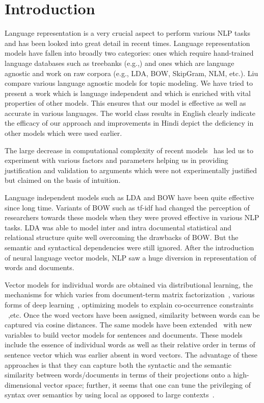 \chapter{Introduction}
Language representation is a very crucial aspect to perform various NLP tasks and has been looked into great detail in recent times. Language representation models have fallen into broadly two categories: ones which require hand-trained language databases such as treebanks (e.g.,\cite{Socher:13}) and ones which are language agnostic and work on raw corpora (e.g., LDA, BOW, SkipGram, NLM, etc.). Liu \cite{Liu:15} compare various language agnostic models for topic modeling. We have tried to present a work which is language independent and which is enriched with vital properties of other models. This ensures that our model is effective as well as accurate in various languages. The world class results in English clearly indicate the efficacy of our approach and improvements in Hindi depict the deficiency in other models which were used earlier.

The large decrease in computational complexity of recent models~\cite{Mikolov:13a,Mikolov:13b,Le:14} has led us to experiment with various factors and parameters helping us in providing justification and validation to arguments which were not experimentally justified but claimed on the basis of intuition.

Language independent models such as LDA  and BOW have been quite effective since long time. Variants of BOW such as tf-idf had changed the perception of researchers towards these models when they were proved effective in various NLP tasks. LDA was able to model inter and intra documental statistical and relational structure quite well overcoming the drawbacks of BOW. But the semantic and syntactical dependencies were still ignored. After the introduction of neural language vector models,  NLP saw a huge diversion in representation of words and documents.

Vector models for individual words are obtained via distributional learning, the mechanisms for which varies from document-term matrix factorization~\cite{Landauer:97}, various forms of deep learning~\cite{Collobert:08,Turian:10,Socher:13}, optimizing models to explain co-occurrence constraints ~\cite{Mikolov:13a,Pennington:14},etc. Once the word vectors have been assigned, similarity between words can be captured via cosine distances. The same models have been extended~\cite{Le:14} with new variables to build vector models for sentences and documents. These models include the essence of individual words as well as their relative order in terms of sentence vector which was earlier absent in word vectors. The advantage of these approaches is that they can capture both the syntactic and the semantic similarity between words/documents in terms of their projections onto a high-dimensional vector space; further, it seems that one can tune the privileging of syntax over semantics by using local as opposed to large contexts~\cite{Huang:12}.

